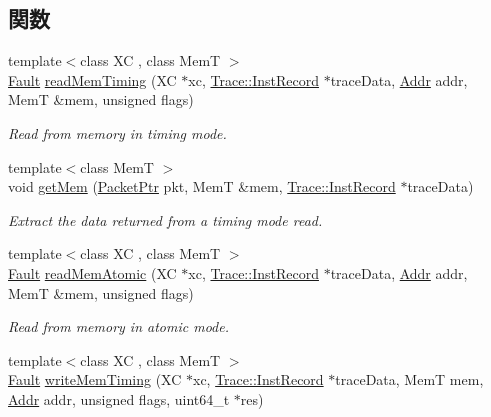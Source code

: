 \subsection*{関数}
\begin{DoxyCompactItemize}
\item 
{\footnotesize template$<$class XC , class MemT $>$ }\\\hyperlink{classRefCountingPtr}{Fault} \hyperlink{generic_2memhelpers_8hh_a491fe4bf4be9d7fed3785c1ae563ff5d}{readMemTiming} (XC $\ast$xc, \hyperlink{classTrace_1_1InstRecord}{Trace::InstRecord} $\ast$traceData, \hyperlink{base_2types_8hh_af1bb03d6a4ee096394a6749f0a169232}{Addr} addr, MemT \&mem, unsigned flags)
\begin{DoxyCompactList}\small\item\em Read from memory in timing mode. \item\end{DoxyCompactList}\item 
{\footnotesize template$<$class MemT $>$ }\\void \hyperlink{generic_2memhelpers_8hh_abed30c0ee19ac7b23d3e6bcf0c86de6f}{getMem} (\hyperlink{classPacket}{PacketPtr} pkt, MemT \&mem, \hyperlink{classTrace_1_1InstRecord}{Trace::InstRecord} $\ast$traceData)
\begin{DoxyCompactList}\small\item\em Extract the data returned from a timing mode read. \item\end{DoxyCompactList}\item 
{\footnotesize template$<$class XC , class MemT $>$ }\\\hyperlink{classRefCountingPtr}{Fault} \hyperlink{generic_2memhelpers_8hh_a6793e28c3f96586257658fd5c41a7074}{readMemAtomic} (XC $\ast$xc, \hyperlink{classTrace_1_1InstRecord}{Trace::InstRecord} $\ast$traceData, \hyperlink{base_2types_8hh_af1bb03d6a4ee096394a6749f0a169232}{Addr} addr, MemT \&mem, unsigned flags)
\begin{DoxyCompactList}\small\item\em Read from memory in atomic mode. \item\end{DoxyCompactList}\item 
{\footnotesize template$<$class XC , class MemT $>$ }\\\hyperlink{classRefCountingPtr}{Fault} \hyperlink{generic_2memhelpers_8hh_aaef940f518929a90f7b5399c66907fb2}{writeMemTiming} (XC $\ast$xc, \hyperlink{classTrace_1_1InstRecord}{Trace::InstRecord} $\ast$traceData, MemT mem, \hyperlink{base_2types_8hh_af1bb03d6a4ee096394a6749f0a169232}{Addr} addr, unsigned flags, uint64\_\-t $\ast$res)

\end{DoxyCompactItemize}

